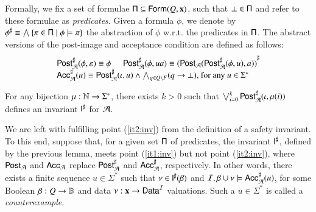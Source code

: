 \documentclass[10pt]{llncs}
\begin{document}
Formally, we fix a set of formulae $\mathsf{\Pi} \subseteq
\mathsf{Form}(Q,\mathbf x)$, such that $\bot \in \mathsf{\Pi}$ and refer to these
formulae as \emph{predicates}. Given a formula $\phi$, we denote by
${\phi}^\sharp \equiv \bigwedge \left\{ \pi \in \mathsf{\Pi} \mid \phi \models
  \pi \right\}$ the abstraction of $\phi$ w.r.t. the predicates in
$\mathsf{\Pi}$. The abstract versions of the post-image and acceptance
condition are defined as follows:
\[\begin{array}{l}
{\mathsf{Post}}^\sharp_{\mathcal{A}}(\phi,\varepsilon) \equiv \phi \hspace*{5mm}
{\mathsf{Post}}^\sharp_{\mathcal{A}}(\phi,ua) \equiv {(\mathsf{Post}_{\mathcal{A}}({\mathsf{Post}}^\sharp_{\mathcal{A}}(\phi,u),a))}^\sharp \\
{\mathsf{Acc}}^\sharp_{\mathcal{A}}(u) \equiv {\mathsf{Post}}^\sharp_{\mathcal{A}}(\iota,u) \wedge \bigwedge_{q \in Q \setminus F} 
(q \rightarrow \bot)\text{, for any $u \in \Sigma^*$}
\end{array}\]

\begin{lemma}\label{lemma:abstract-invariant}
  For any bijection $\mu : {\bf \mathbb{N}} \rightarrow \Sigma^*$, there exists
  $k>0$ such that $\bigvee_{i=0}^k {\mathsf{Post}}^\sharp_{\mathcal{A}}(\iota,\mu(i))$ defines
  an invariant ${\mathsf{I}}^\sharp$ for $\mathcal{A}$. 
\end{lemma}


We are left with fulfilling point (\ref{it2:inv}) from the definition
of a safety invariant. To this end, suppose that, for a given set
$\mathsf{\Pi}$ of predicates, the invariant ${\mathsf{I}}^\sharp$, defined by the
previous lemma, meets point (\ref{it1:inv}) but not point
(\ref{it2:inv}), where $\mathsf{Post}_{\mathcal{A}}$ and $\mathsf{Acc}_{\mathcal{A}}$ replace
${\mathsf{Post}}^\sharp_{\mathcal{A}}$ and ${\mathsf{Acc}}^\sharp_{\mathcal{A}}$, respectively. In other words,
there exists a finite sequence $u \in \Sigma^*$ such that $\nu \in
{\mathsf{I}}^\sharp(\beta)$ and $\mathcal{I},\beta\cup\nu \models {\mathsf{Acc}}^\sharp_{\mathcal{A}}(u)$,
for some Boolean $\beta : Q \rightarrow \mathbb{B}$ and data $\nu :
\mathbf x \rightarrow \mathsf{Data}^{\mathcal{I}}$ valuations. Such a $u\in\Sigma^*$ is
called a \emph{counterexample}.
\end{document}
